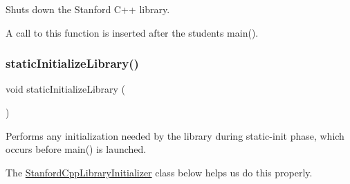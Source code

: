 Shuts down the Stanford C++ library. 

A call to this function is inserted after the student\textquotesingle{}s main(). \mbox{\label{namespacestanfordcpplib_ad5dc96d7e324f70b6bd681ad41abcaa7}} 
\subsubsection{\texorpdfstring{static\+Initialize\+Library()}{staticInitializeLibrary()}}
{\footnotesize\ttfamily void static\+Initialize\+Library (\begin{DoxyParamCaption}{ }\end{DoxyParamCaption})}



Performs any initialization needed by the library during static-\/init phase, which occurs before main() is launched. 

The \mbox{\hyperlink{classstanfordcpplib_1_1StanfordCppLibraryInitializer}{Stanford\+Cpp\+Library\+Initializer}} class below helps us do this properly. 